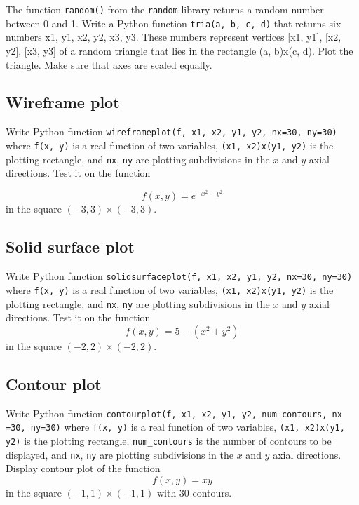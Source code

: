 The function {\tt random()} from the {\tt random} library returns a random number between 0 and 1.  
Write a Python function {\tt tria(a, b, c, d)} that returns six numbers x1, y1, x2, y2, x3, y3. These numbers 
represent vertices [x1, y1], [x2, y2], [x3, y3] of a random triangle that lies in the rectangle (a, b)x(c, d). 
Plot the triangle. Make sure that axes are scaled equally.


\subsection{Wireframe plot}

Write Python function {\tt wireframeplot(f, x1, x2, y1, y2, nx=30, ny=30)} where {\tt f(x, y)} is a real function 
of two variables, {\tt (x1, x2)x(y1, y2)} is the plotting rectangle, and {\tt nx}, {\tt ny} are plotting 
subdivisions in the $x$ and $y$ axial directions. Test it on the function 

$$
f(x, y) = e^{-x^2 - y^2}
$$
in the square $(-3, 3)\times (-3, 3)$.


\subsection{Solid surface plot}

Write Python function {\tt solidsurfaceplot(f, x1, x2, y1, y2, nx=30, ny=30)} where {\tt f(x, y)} is a real function 
of two variables, {\tt (x1, x2)x(y1, y2)} is the plotting rectangle, and {\tt nx}, {\tt ny} are plotting 
subdivisions in the $x$ and $y$ axial directions. Test it on the function 
$$
f(x, y) = 5 - (x^2 + y^2)
$$
in the square $(-2, 2)\times (-2, 2)$.


\subsection{Contour plot}

Write Python function {\tt contourplot(f, x1, x2, y1, y2, num\_contours, 
nx =30, ny=30)} where {\tt f(x, y)} is a real function 
of two variables, {\tt (x1, x2)x(y1, y2)} is the plotting rectangle, {\tt num\_contours}
is the number of contours to be displayed, and {\tt nx}, {\tt ny} are plotting 
subdivisions in the $x$ and $y$ axial directions. Display contour plot of the function 
$$
f(x, y) = xy 
$$
in the square $(-1, 1)\times (-1, 1)$ with 30 contours.

